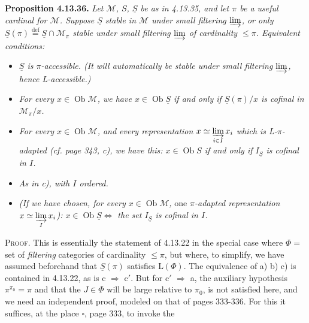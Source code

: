 \documentclass[11pt]{article}
\newcommand{\printedpage}[1]{\marginpar{\footnotesize p.~#1}}
\newcommand{\msp}[1]{\marginpar{\footnotesize [#1]}}
\newcommand{\Ob}{\operatorname{Ob}}
\newcommand{\limind}{\varinjlim}
\newcommand{\defeq}{\overset{\text{def}}{=}}
\begin{document}
\textbf{Proposition 4.13.36.} \textit{Let $\mathcal{M}$, $S$, $\underline{S}$ be as in 4.13.35, and let $\pi$ be a useful cardinal for $\mathcal{M}$. Suppose $\underline{S}$ stable in $\mathcal{M}$ under small filtering $\limind$, or only $\underline{S}(\pi) \defeq \underline{S} \cap \mathcal{M}_\pi$ stable under small filtering $\limind$ of cardinality $\leqslant \pi$. Equivalent conditions:}
\begin{itemize}[leftmargin=2.5em]
\item[\textit{a)}] \textit{$\underline{S}$ is $\pi$-accessible. (It will automatically be stable under small filtering $\limind$, hence L-accessible.)}
\item[\textit{b)}] \textit{For every $x \in \Ob \mathcal{M}$, we have $x \in \Ob \underline{S}$ if and only if $\underline{S}(\pi)/x$ is cofinal in $\mathcal{M}_\pi/x$.}
\printedpage{136}
\item[\textit{c)}] \textit{For every $x \in \Ob \mathcal{M}$, and every representation $x \simeq \varinjlim\limits_{i\in I} x_i$}
\msp{page 359}
\textit{which is L-$\pi$-adapted (cf. page 343, c), we have this: $x \in \Ob S$ if and only if $I_{\underline{S}}$ is cofinal in $I$.}
\item[\textit{c}$'$\textit{)}] \textit{As in c), with $I$ ordered.}
\item[\textit{c}$''$\textit{)}] \textit{(If we have chosen, for every $x \in \Ob \mathcal{M}$,} one \textit{$\pi$-adapted representation $x \simeq \varinjlim\limits_{I} x_i$): $x \in \Ob \underline{S} \Longleftrightarrow$ the set $I_{\underline{S}}$ is cofinal in $I$.}
\end{itemize}
\textsc{Proof}. This is essentially the statement of 4.13.22 in the special case where $\Phi =$ set of \textit{filtering} categories of cardinality $\leqslant \pi$, but where, to simplify, we have assumed beforehand that $\underline{S}(\pi)$ satisfies $\mathrm{L}(\Phi)$. The equivalence of a) b) c) is contained in 4.13.22, as is c $\Longrightarrow$ c$'$. But for c$'$ $\Longrightarrow$ a, the auxiliary hypothesis $\pi^{\pi_0} = \pi$ and that the $J \in \Phi$ will be large relative to $\pi_0$, is not satisfied here, and we need an independent proof, modeled on that of pages 333-336. For this it suffices, at the place $\square$, page 333, to invoke the %
\end{document}
